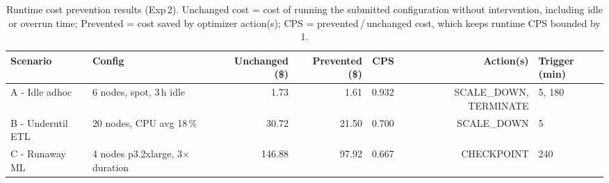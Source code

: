 \begin{table}[t]
\centering
\caption{Runtime cost prevention results (Exp\,2). Unchanged cost = cost of running the submitted configuration without intervention, including idle or overrun time; Prevented = cost saved by optimizer action(s); CPS = prevented\,/\,unchanged cost, which keeps runtime CPS bounded by 1.}
\label{tab:runtime}
\begin{tabular}{llrrrrl}
\toprule
Scenario & Config & Unchanged (\$) & Prevented (\$) & CPS & Action(s) & Trigger (min) \\
\midrule
A - Idle adhoc & 6 nodes, spot, 3\,h idle & 1.73 & 1.61 & 0.932 & SCALE_DOWN, TERMINATE & 5, 180 \\
B - Underutil ETL & 20 nodes, CPU avg 18\,\% & 30.72 & 21.50 & 0.700 & SCALE_DOWN & 5 \\
C - Runaway ML & 4 nodes p3.2xlarge, 3$\times$ duration & 146.88 & 97.92 & 0.667 & CHECKPOINT & 240 \\
\bottomrule
\end{tabular}
\end{table}